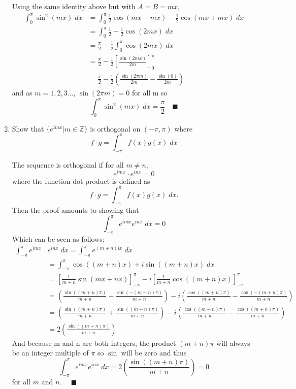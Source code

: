 \documentclass[12pt]{article}
\begin{document}
\begin{enumerate}
    \color{blue}
    Using the same identity above but with $A = B = mx$,
    \begin{align*}
        \int_0^\pi \sin^2 (mx)\; dx &= \int_0^\pi \frac{1}{2}\cos(mx - mx) - \frac{1}{2}\cos(mx +mx)\;dx\\
        &= \int_0^\pi \frac{1}{2} - \frac{1}{2}\cos(2mx)\; dx\\
        &= \frac{\pi}{2} -\frac{1}{2}\int_0^\pi \cos(2mx)\; dx\\
        &= \frac{\pi}{2} - \frac{1}{2}\left[\frac{\sin(2mx)}{2m}\right]_0^\pi\\
        &= \frac{\pi}{2} - \frac{1}{2}\left(\frac{\sin(2\pi m)}{2m} - \frac{\sin(0)}{2m}\right)
    \end{align*}
    and as $m = 1, 2, 3...$, $\sin(2\pi m) = 0$ for all m so 
    \[\int_0^\pi \sin^2 (mx)\; dx = \frac{\pi}{2} \quad \blacksquare\]
    
    \color{black}
    \item Show that $\{e^{imx} | m \in \mathbb{Z}\}$ is orthogonal on $(-\pi, \pi)$ where 
    \[f \cdot g = \int_{-\pi}^\pi f(x) g(x) \; dx\]

    \color{blue}
    The sequence is orthogonal if for all $m \neq n$, 
    \[e^{imx} \cdot e^{inx} = 0\]
    where the function dot product is defined as 
    \[f \cdot g = \int_{-\pi}^\pi f(x) g(x) \; dx.\]
    Then the proof amounts to showing that 
    \[\int_{-\pi}^\pi e^{imx} e^{inx} \; dx = 0\]
    Which can be seen as follows:
    \begin{align*}
        \int_{-\pi}^\pi e^{imx} &e^{inx} \; dx = \int_{-\pi}^\pi e^{(m+n)ix} \; dx\\
        &= \int_{-\pi}^\pi \cos((m+n)x) + i\sin((m+n)x)\; dx\\
        &= \left[\frac{1}{m+n}\sin(mx +nx)\right]_{-\pi}^\pi - i\left[\frac{1}{m+n}\cos((m+n)x)\right]_{-\pi}^\pi\\
        &= \left(\frac{\sin((m+n)\pi)}{m + n} - \frac{\sin(-(m+n)\pi)}{m+n}\right) -i \left(\frac{\cos((m+n)\pi)}{m + n} - \frac{\cos(-(m +n)\pi)}{m + n}\right)\\
        &= \left(\frac{\sin((m+n)\pi)}{m + n} + \frac{\sin((m+n)\pi)}{m+n}\right) -i \left(\frac{\cos((m+n)\pi)}{m + n} - \frac{\cos((m +n)\pi)}{m + n}\right)\\
        &= 2\left(\frac{\sin((m+n)\pi)}{m + n}\right)
    \end{align*}
    And because m and n are both integers, the product $(m +n)\pi$ will always be an integer multiple of $\pi$ so $\sin$ will be zero and thus 
    \[\int_{-\pi}^\pi e^{imx} e^{inx} \; dx  = 2\left(\frac{\sin((m+n)\pi)}{m + n}\right) =0 \]
    for all $m$ and $n$. $\quad \blacksquare$
    \color{black}
\end{enumerate}
\end{document}
